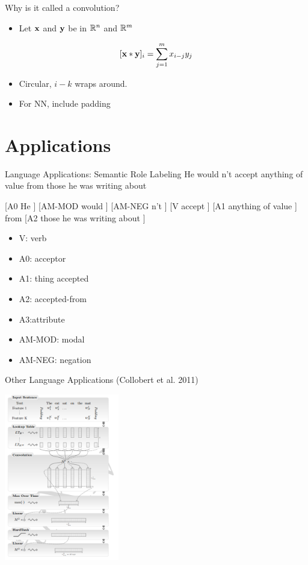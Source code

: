\documentclass{beamer}
\begin{document}
\begin{frame}{Why is it called a convolution?}

  \begin{itemize}
  \item Let $\mathbf{x}$ and $\mathbf{y}$ be in $\mathbb{R}^n$ and $\mathbb{R}^m$ 
  \end{itemize}
  
  \[[\mathbf{x} \ast \mathbf{y}]_i = \sum_{j=1}^m   x_{i-j} y_j\]
  
  \begin{itemize}
  \item Circular, $i-k$ wraps around. 
    \air 
  \item For NN, include padding
  \end{itemize}

  
\end{frame}


\section{Applications}


\begin{frame}{Language Applications: Semantic Role Labeling }
 He  would  n't accept anything of value from those he was writing about  

 \air 

 [A0 He ] [AM-MOD would ] [AM-NEG n't ] [V accept ] [A1 anything of value ] from [A2 those he was writing about ] 

\begin{itemize}
  \item V: verb 
   \item A0: acceptor 
   \item A1: thing accepted 
   \item A2: accepted-from 
   \item A3:attribute 
   \item AM-MOD: modal 
     \item  AM-NEG: negation
\end{itemize}
\end{frame}

\begin{frame}{Other Language Applications (Collobert et al. 2011) }
  \begin{center}
    \includegraphics[width=5cm]{cwconv}
  \end{center}
\end{frame}
\end{document}
